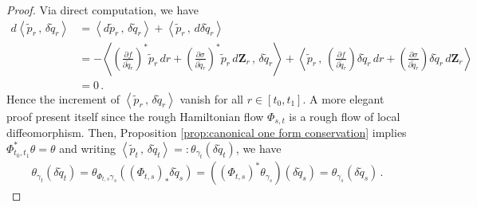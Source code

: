 \documentclass[11pt, oneside]{article}
\numberwithin{equation}{section}
\theoremstyle{definition}
\newcommand{\wt}[1]{\widetilde{#1}}
\newcommand{\scp}[2]{{\left\langle {#1}\, , \, {#2}\right\rangle}}
\def\p{{\partial}}
\def\p{\partial}
\begin{document}
\begin{proof}
    Via direct computation, we have
    \begin{align*}
        d\scp{\wt{p}_r}{\delta\wt{q}_r}
        &= \scp{d\wt{p}_r}{\delta\wt{q}_r} + \scp{\wt{p}_r}{d\delta\wt{q}_r}\\
        &= -\scp{\left(\frac{\p f}{\p \wt{q}_r}\right)^*\wt{p}_r\,dr + \left(\frac{\p \sigma}{\p \wt{q}_r}\right)^* \wt{p}_r\,d\mathbf{Z}_r}{\delta\wt{q}_r} + \scp{\wt{p}_r}{\left(\frac{\p f}{\p \wt{q}_r}\right)\delta\wt{q}_r \,dr + \left(\frac{\p \sigma}{\p \wt{q}_r}\right)\delta\wt{q}_r \,d\mathbf{Z}_r}\\
        & = 0\,.
    \end{align*}
    Hence the increment of $\scp{\wt{p}_r}{\delta\wt{q}_r}$ vanish for all $r \in [t_0,t_1]$. 
    A more elegant proof present itself since the rough Hamiltonian flow $\Phi_{s,t}$ is a rough flow of local diffeomorphism. Then, Proposition \ref{prop:canonical one form conservation} implies $\Phi_{t_0,t_1}^*\theta = \theta$ and writing $\scp{\wt{p}_t}{\delta\wt{q}_t} =: \theta_{\gamma_t}(\delta \wt{q}_t)$, we have
    \begin{align*}
        \theta_{\gamma_t}(\delta \wt{q}_t) = \theta_{\Phi_{t,s}\gamma_s}(\left(\Phi_{t,s}\right)_*\delta \wt{q}_s) = (\left(\Phi_{t,s}\right)^*\theta_{\gamma_s}) (\delta \wt{q}_s) = \theta_{\gamma_s}(\delta \wt{q}_s)\,.
    \end{align*}
\end{proof}
\end{document}
